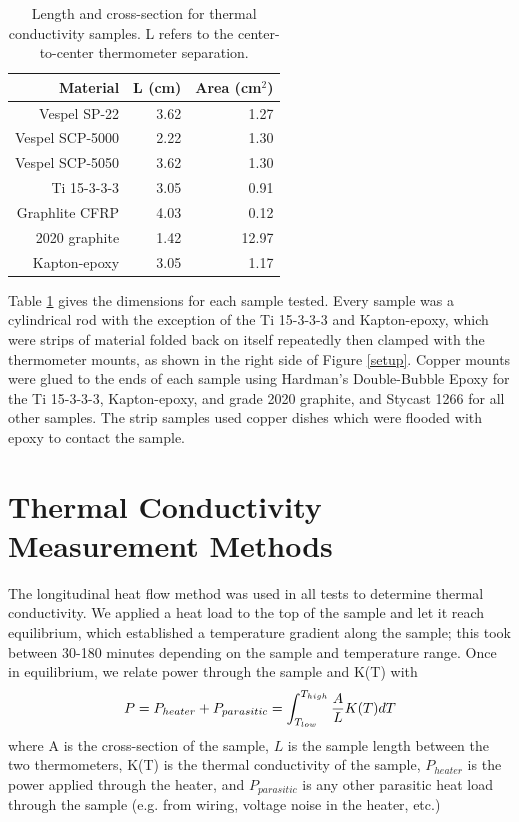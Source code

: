 \documentclass[final]{svjour2}
\begin{document}
\begin{table}
\centering
\small
{}
\begin{tabular}{rrr}
\toprule
\textbf{Material} & L (cm) & Area (cm$^2$) \\\midrule
Vespel SP-22 & 3.62 & 1.27 \\
Vespel SCP-5000 & 2.22 & 1.30 \\
Vespel SCP-5050 & 3.62 & 1.30 \\
Ti 15-3-3-3 & 3.05 & 0.91 \\
Graphlite CFRP & 4.03 & 0.12 \\
2020 graphite & 1.42 & 12.97 \\
Kapton-epoxy & 3.05 & 1.17 \\
\bottomrule
\end{tabular}
\caption{{\small Length and cross-section for thermal conductivity samples. L refers to the center-to-center thermometer separation.}}
\label{dim}
\end{table}

Table \ref{dim} gives the dimensions for each sample tested. Every sample was a cylindrical rod with the exception of the Ti 15-3-3-3 and Kapton-epoxy, which were strips of material folded back on itself repeatedly then clamped with the thermometer mounts, as shown in the right side of Figure \ref{setup}. Copper mounts were glued to the ends of each sample using Hardman's Double-Bubble Epoxy for the Ti 15-3-3-3, Kapton-epoxy, and grade 2020 graphite, and Stycast 1266 for all other samples. The strip samples used copper dishes which were flooded with epoxy to contact the sample.

\section{Thermal Conductivity Measurement Methods}
The longitudinal heat flow method was used in all tests to determine thermal conductivity. We applied a heat load to the top of the sample and let it reach equilibrium, which established a temperature gradient along the sample; this took between 30-180 minutes depending on the sample and temperature range. Once in equilibrium, we relate power through the sample and K(T) with
\begin{equation}
P = P_{heater} + P_{parasitic} = \int_{T_{low}}^{T_{high}} \frac{A}{L} K(T)dT\\
\label{heat_flow}
\end{equation}
where A is the cross-section of the sample, $L$ is the sample length between the two thermometers, K(T) is the thermal conductivity of the sample, $P_{heater}$ is the power applied through the heater, and $P_{parasitic}$ is any other parasitic heat load through the sample (e.g. from wiring, voltage noise in the heater, etc.)
\end{document}
